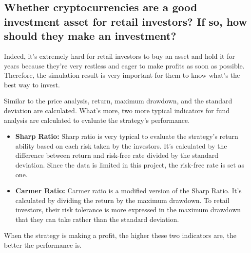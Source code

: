 \documentclass[a4paper]{article}
\begin{document}
\subsection{Whether cryptocurrencies are a good investment asset for retail investors? If so, how should they make an investment?}
Indeed, it's extremely hard for retail investors to buy an asset and hold it for years because they're very restless and eager to make profits as soon as possible. Therefore, the simulation result is very important for them to know what's the best way to invest.
\par Similar to the price analysis, return, maximum drawdown, and the standard deviation are calculated. What's more, two more typical indicators for fund analysis are calculated to evaluate the strategy's performance.
\begin{itemize}
    \item \textbf{Sharp Ratio: } Sharp ratio is very typical to evaluate the strategy's return ability based on each risk taken by the investors. It's calculated by the difference between return and risk-free rate divided by the standard deviation. Since the data is limited in this project, the risk-free rate is set as one.
    \item \textbf{Carmer Ratio: } Carmer ratio is a modified version of the Sharp Ratio. It's calculated by dividing the return by the maximum drawdown. To retail investors, their risk tolerance is more expressed in the maximum drawdown that they can take rather than the standard deviation.
\end{itemize}
When the strategy is making a profit, the higher these two indicators are, the better the performance is. 
\end{document}
